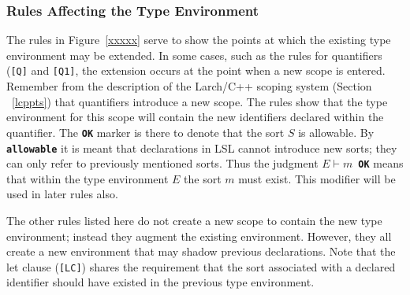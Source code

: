 \documentclass[12pt]{article} %
\newcommand{\reserved}[1]{\textbf{\texttt{#1}}} %
\newcommand{\RULELAB}[1]{\texttt{#1}}
\begin{document}
\subsubsection{Rules Affecting the Type Environment}
The rules in Figure~\ref{xxxxx} serve to show the points at which the
existing type environment may be extended. In some cases, such as the
rules for quantifiers (\RULELAB{[Q]} and \RULELAB{[Q1]}, the extension
occurs at the point when a new scope is entered. Remember from the
description of the Larch/C++ scoping system (Section ~\ref{lcppts})
that quantifiers introduce a new scope. The rules show that the type
environment for this scope will contain the new identifiers declared
within the quantifier. The \reserved{OK} marker is there to denote
that the sort $S$ is allowable. By \reserved{allowable} it is meant
that declarations in LSL cannot introduce new sorts; they can only
refer to previously mentioned sorts. Thus the judgment $E \vdash
m$\reserved{ OK} means that within the type environment $E$ the sort
$m$ must exist. This modifier will be used in later rules also.

The other rules listed here do not create a new scope to contain the
new type environment; instead they augment the existing environment. However,
they all create a new environment that may shadow previous
declarations. Note that the let clause (\RULELAB{[LC]}) shares the
requirement that the sort associated with a declared identifier should
have existed in the previous type environment.
\end{document}
